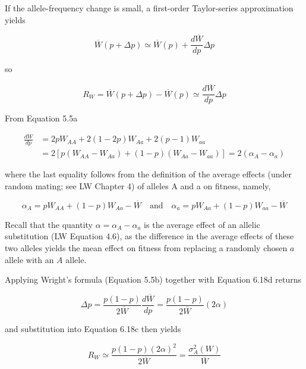\documentclass{article}
\begin{document}
If the allele-frequency change is small, a first-order Taylor-series approximation yields

\begin{equation}
\overline{W}(p+\Delta p)\simeq\overline{W}(p)+\frac{d\overline{W}}{d p}\Delta p
\tag{6.18b}
\label{eq:6_18b}
\end{equation}

so

\begin{equation}
R_{W}=\overline{W}(p+\Delta p)-\overline{W}(p)\simeq\frac{d\overline{W}}{d p}\Delta p
\tag{6.18c}
\label{eq:6_18c}
\end{equation}

From Equation 5.5a

\begin{equation}
\begin{aligned}\frac{dW}{dp}&=2pW_{AA}+2(1-2p)W_{Aa}+2(p-1)W_{aa}\\&=2\left[p(W_{AA}-W_{Aa})+(1-p)(W_{Aa}-W_{aa})\right]=2(\alpha_{A}-\alpha_{a})\end{aligned}
\tag{6.18d}
\label{eq:6_18d}
\end{equation}

where the last equality follows from the definition of the average effects (under random mating; see LW Chapter 4) of alleles A and a on fitness, namely,

\begin{equation}
\alpha_{A}=p W_{A A}+\left(1-p\right)W_{A a}-\overline{W}\quad\mathrm{a n d}\quad\alpha_{a}=p W_{A a}+\left(1-p\right)W_{a a}-\overline{W}
\tag{6.18e}
\label{eq:6_18e}
\end{equation}

Recall that the quantity  $ \alpha = \alpha_A - \alpha_a $ is the average effect of an allelic substitution (LW Equation 4.6), as the difference in the average effects of these two alleles yields the mean effect on fitness from replacing a randomly chosen  $ a $ allele with an  $ A $ allele.

Applying Wright’s formula (Equation 5.5b) together with Equation 6.18d returns

\begin{equation}
\Delta p=\frac{p(1-p)}{2\overline{W}}\frac{d\overline{W}}{dp}=\frac{p(1-p)}{2\overline{W}}(2\alpha)
\tag{6.18f}
\label{eq:6_18f}
\end{equation}

and substitution into Equation 6.18c then yields

\begin{equation}
R_{W}\simeq\frac{p(1-p)(2\alpha)^{2}}{2\overline{W}}=\frac{\sigma_{A}^{2}(W)}{\overline{W}}
\tag{6.18g}
\label{eq:6_18g}
\end{equation}
\end{document}

